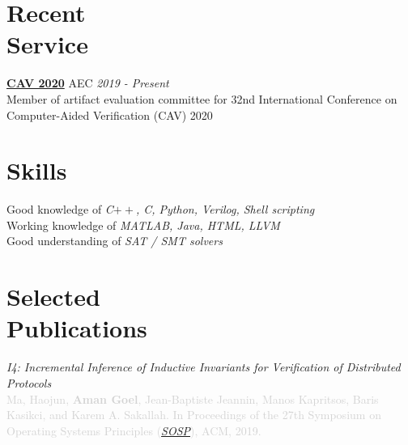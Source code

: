 \documentclass[margin,line,letter]{resume}
\begin{document}
\begin{resume}
\section{\mysidestyle Recent\\Service}
    \href{http://i-cav.org/2020/}{\textbf{CAV 2020}} AEC \hfill \emph{2019 - Present}\\
    \phantom{xx}\hspace{1ex} Member of artifact evaluation committee for 32nd International Conference on \\
    \phantom{xx}\hspace{1ex} Computer-Aided Verification (CAV) 2020

    


\section{\mysidestyle Skills}
    Good knowledge of \emph{C$++$, C, Python, Verilog, Shell scripting} \\
    Working knowledge of \emph{MATLAB, Java, HTML, LLVM}  \\
    Good understanding of \emph{SAT / SMT solvers}

\section{\mysidestyle Selected\\Publications \\ \href{https://scholar.google.com/citations?user=iFCl5vEAAAAJ&hl=en&oi=sra}{\faGraduationCap}}
\hspace{-2em} \href{https://sosp19.rcs.uwaterloo.ca/program.html}{\faFilePdfO} \hspace{0.3em}
\textit{I4: Incremental Inference of Inductive Invariants for Verification of Distributed Protocols} \\
\textcolor{lightgray}{Ma, Haojun, \textbf{Aman Goel}, Jean-Baptiste Jeannin, Manos Kapritsos, Baris Kasikci, and Karem A. Sakallah. In Proceedings of the 27th Symposium on Operating Systems Principles (\href{https://sosp19.rcs.uwaterloo.ca/}{\textit{SOSP}}), ACM, 2019.}


\end{resume}
\end{document}
